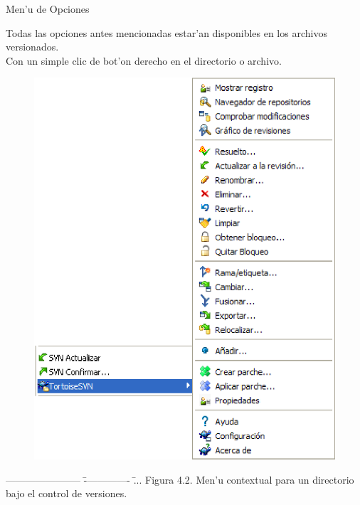 \documentclass[xcolor=dvipsnames]{beamer}
\begin{document}
	\begin{frame}{Men'u de Opciones}
	\scriptsize
	{
	\begin{tabbing}
		Todas las opciones antes mencionadas estar'an disponibles en los archivos versionados.\\
		Con un simple clic de bot'on derecho en el directorio o archivo.
	\end{tabbing}
	\begin{figure}
	\centering 
		\includegraphics[scale=0.46]{svn_menu_sobre_repo.eps}
	\end{figure}
	\begin{tabbing}
		----------------------- \= -------------- \= ... \kill
		\> Figura 4.2. Men'u contextual para un directorio\\
		\>\> bajo el control de versiones.
	\end{tabbing}
	}
	\end{frame}		
\end{document}
